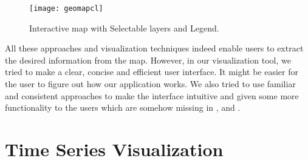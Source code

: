 \begin{figure} [H]
  \begin{center}
    \texttt{[image: geomapcl]}
    \caption{Interactive map with Selectable layers and Legend.}
    \label{fig:mapgeo}
  \end{center}
\end{figure}

All these approaches and visualization techniques indeed enable users to extract the desired information from the map. However, in our visualization tool, we tried to make a clear, concise and efficient user interface. It might be easier for the user to figure out how our application works. We also tried to use familiar and consistent approaches to make the interface intuitive and given some more functionality to the users which are somehow missing in \cite{cbg2016}, \cite{wp2015} and \cite{gportal2016}. 

\section{Time Series Visualization}

